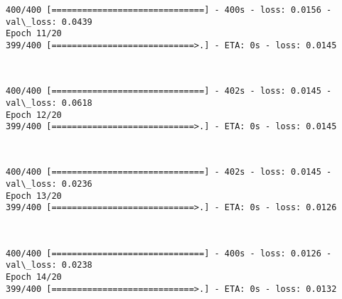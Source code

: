 \documentclass[11pt]{article}
\begin{document}
    \begin{Verbatim}[commandchars=\\\{\}]
400/400 [==============================] - 400s - loss: 0.0156 - val\_loss: 0.0439
Epoch 11/20
399/400 [============================>.] - ETA: 0s - loss: 0.0145
    \end{Verbatim}

    \begin{center}
    \end{center}
    { \hspace*{\fill} \\}
    
    \begin{Verbatim}[commandchars=\\\{\}]
400/400 [==============================] - 402s - loss: 0.0145 - val\_loss: 0.0618
Epoch 12/20
399/400 [============================>.] - ETA: 0s - loss: 0.0145
    \end{Verbatim}

    \begin{center}
    \end{center}
    { \hspace*{\fill} \\}
    
    \begin{Verbatim}[commandchars=\\\{\}]
400/400 [==============================] - 402s - loss: 0.0145 - val\_loss: 0.0236
Epoch 13/20
399/400 [============================>.] - ETA: 0s - loss: 0.0126
    \end{Verbatim}

    \begin{center}
    \end{center}
    { \hspace*{\fill} \\}
    
    \begin{Verbatim}[commandchars=\\\{\}]
400/400 [==============================] - 400s - loss: 0.0126 - val\_loss: 0.0238
Epoch 14/20
399/400 [============================>.] - ETA: 0s - loss: 0.0132
    \end{Verbatim}

    \begin{center}
    \end{center}
    { \hspace*{\fill} \\}
    
\end{document}
